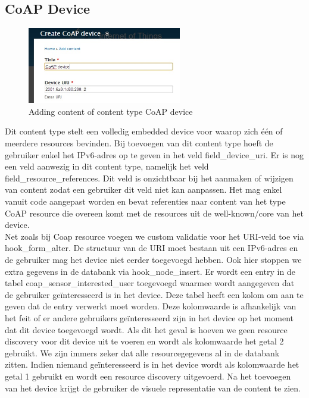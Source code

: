\subsection{CoAP Device}
\begin{figure}
\vspace{-10pt}
\centering
\label{fig:addCoapDevice}
\includegraphics[width=0.6\textwidth]{fig/add_coap_device}
\vspace{-20pt}
\centering
\caption{Adding content of content type CoAP device}
\centering
\vspace{-20pt}
\end{figure}
Dit content type stelt een volledig embedded device voor waarop zich \'{e}\'{e}n of meerdere resources bevinden. Bij toevoegen van dit content type hoeft de gebruiker enkel het IPv6-adres op te geven in het veld field\_device\_uri. Er is nog een veld aanwezig in dit content type, namelijk het veld field\_resource\_references. Dit veld is onzichtbaar bij het aanmaken of wijzigen van content zodat een gebruiker dit veld niet kan aanpassen. Het mag enkel vanuit code aangepast worden en bevat referenties naar content van het type CoAP resource die overeen komt met de resources uit de well-known/core van het device.\\

Net zoals bij Coap resource voegen we custom validatie voor het URI-veld toe via hook\_form\_alter. De structuur van de URI moet bestaan uit een IPv6-adres en de gebruiker mag het device niet eerder toegevoegd hebben. Ook hier stoppen we extra gegevens in de databank via hook\_node\_insert. Er wordt een entry in de tabel coap\_sensor\_interested\_user toegevoegd waarmee wordt aangegeven dat de gebruiker ge\"{i}nteresseerd is in het device. Deze tabel heeft een kolom om aan te geven dat de entry verwerkt moet worden. Deze kolomwaarde is afhankelijk van het feit of er andere gebruikers ge\"{i}nteresseerd zijn in het device op het moment dat dit device toegevoegd wordt. Als dit het geval is hoeven we geen resource discovery voor dit device uit te voeren en wordt als kolomwaarde het getal 2 gebruikt. We zijn immers zeker dat alle resourcegegevens al in de databank zitten. Indien niemand ge\"{i}nteresseerd is in het device wordt als kolomwaarde het getal 1 gebruikt en wordt een resource discovery uitgevoerd. Na het toevoegen van het device krijgt de gebruiker de visuele representatie van de content te zien.\\

